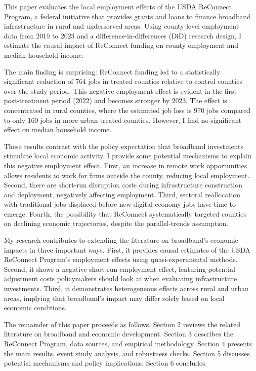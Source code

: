 \documentclass[12pt]{article}
\begin{document}
This paper evaluates the local employment effects of the USDA ReConnect Program, a federal initiative that provides grants and loans to finance broadband infrastructure in rural and underserved areas. Using county-level employment data from 2019 to 2023 and a difference-in-differences (DiD) research design, I estimate the causal impact of ReConnect funding on county employment and median household income.

The main finding is surprising: ReConnect funding led to a statistically significant reduction of 764 jobs in treated counties relative to control counties over the study period. This negative employment effect is evident in the first post-treatment period (2022) and becomes stronger by 2023. The effect is concentrated in rural counties, where the estimated job loss is 970 jobs compared to only 160 jobs in more urban treated counties. However, I find no significant effect on median household income.

These results contrast with the policy expectation that broadband investments stimulate local economic activity. I provide some potential mechanisms to explain this negative employment effect. First, an increase in remote work opportunities allows residents to work for firms outside the county, reducing local employment. Second, there are short-run disruption costs during infrastructure construction and deployment, negatively affecting employment. Third, sectoral reallocation with traditional jobs displaced before new digital economy jobs have time to emerge. Fourth, the possibility that ReConnect systematically targeted counties on declining economic trajectories, despite the parallel-trends assumption.

My research contributes to extending the literature on broadband's economic impacts in three important ways. First, it provides causal estimates of the USDA ReConnect Program's employment effects using quasi-experimental methods. Second, it shows a negative short-run employment effect, featuring potential adjustment costs policymakers should look at when evaluating infrastructure investments. Third, it demonstrates heterogeneous effects across rural and urban areas, implying that broadband's impact may differ solely based on local economic conditions.

The remainder of this paper proceeds as follows. Section 2 reviews the related literature on broadband and economic development. Section 3 describes the ReConnect Program, data sources, and empirical methodology. Section 4 presents the main results, event study analysis, and robustness checks. Section 5 discusses potential mechanisms and policy implications. Section 6 concludes.
\end{document}
